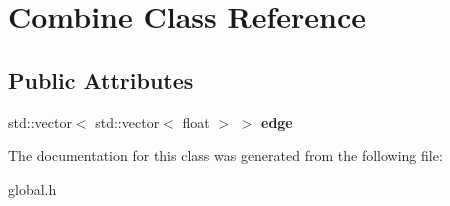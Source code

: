 \hypertarget{class_combine}{}\section{Combine Class Reference}
\label{class_combine}
\subsection*{Public Attributes}
\begin{DoxyCompactItemize}
\item 
\mbox{\label{class_combine_a6a910528bedd4c33f36b313c69657cc0}} 
std\+::vector$<$ std\+::vector$<$ float $>$ $>$ {\bfseries edge}
\end{DoxyCompactItemize}


The documentation for this class was generated from the following file\+:\begin{DoxyCompactItemize}
\item 
global.\+h\end{DoxyCompactItemize}
